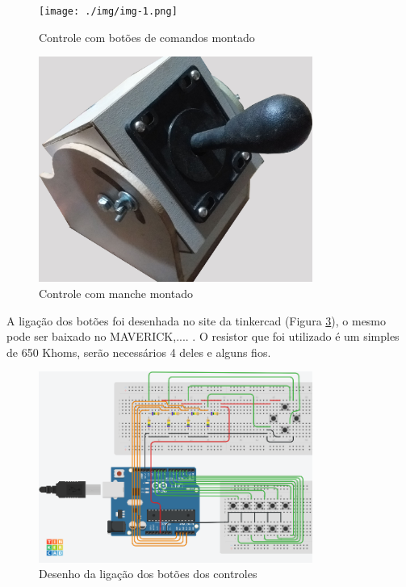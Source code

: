 \documentclass[
	12pt,			%
	openright,		%
	oneside,			%
	a4paper,			%
	chapter=TITLE,		%
	english,			%
	brazil,			%
	]{abntex2}
\begin{document}
\begin{figure}[H]
	\centering
		\texttt{[image: ./img/img-1.png]}
		\caption{Controle com botões de comandos montado}
		\label{img:img-1}
\end{figure}

\begin{figure}[H]
	\centering
		\includegraphics[width=0.8\textwidth]{./img/img-10.jpg}
		\caption{Controle com manche montado}
		\label{img:img-10}
\end{figure}

A ligação dos botões foi desenhada no site da tinkercad (Figura \ref{img:img-19}), o mesmo pode ser baixado no MAVERICK,.... . O resistor que foi utilizado é um simples de 650 Khoms, serão necessários 4 deles e alguns fios.

\begin{figure}[H]
	\centering
		\includegraphics[width=0.8\textwidth]{./img/img-19.png}
		\caption{Desenho da ligação dos botões dos controles}
		\label{img:img-19}
\end{figure}
\end{document}
